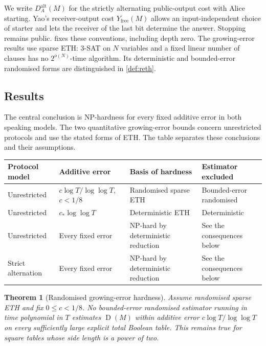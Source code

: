 \documentclass[11pt]{article} \usepackage[utf8]{inputenc}
\theoremstyle{plain} \newtheorem{theorem}{Theorem}[section]
\theoremstyle{definition} \newaliascnt{definition}{theorem}
\newcommand{\D}{\operatorname{D}}
\begin{document}
We write $D_A^{\mathrm{alt}}(M)$ for the strictly alternating public-output
cost with Alice starting. Yao's receiver-output cost $Y_{\mathrm{free}}(M)$
allows an input-independent choice of starter and lets the receiver of the
last bit determine the answer. Stopping remains public.
 fixes these conventions, including depth zero.
The growing-error results use sparse ETH: $3$-SAT on $N$ variables and a
fixed linear number of clauses has no $2^{o(N)}$-time algorithm. Its
deterministic and bounded-error randomised forms are distinguished in
\cref{def:reth}.

\subsection{Results}
\label{sec:results}

The central conclusion is NP-hardness for every fixed additive error in
both speaking models. The two quantitative growing-error bounds concern
unrestricted protocols and use the stated forms of ETH. The table separates
these conclusions and their assumptions.

\begin{center}
\small
\begin{tabular}{@{}p{.18\linewidth}p{.27\linewidth}p{.25\linewidth}p{.19\linewidth}@{}}
\toprule
Protocol model & Additive error & Basis of hardness & Estimator excluded\\
\midrule
Unrestricted & $c\log T/\log\log T$, $c<1/8$ & Randomised sparse ETH & Bounded-error randomised\\
\addlinespace
Unrestricted & $c_*\log\log T$ & Deterministic ETH & Deterministic\\
\addlinespace
Unrestricted & Every fixed error & NP-hard by deterministic reduction & See the consequences below\\
\addlinespace
Strict alternation & Every fixed error & NP-hard by deterministic reduction & See the consequences below\\
\bottomrule
\end{tabular}
\end{center}

\begin{theorem}[Randomised growing-error hardness]
\label{thm:quantitative}
Assume randomised sparse ETH and fix $0\le c<1/8$. No bounded-error randomised
estimator running in time polynomial in $T$ estimates $\D(M)$ within
additive error $c\log T/\log\log T$ on every sufficiently large explicit
total Boolean table. This remains true for square tables whose side length
is a power of two.
\end{theorem}
\end{document}
